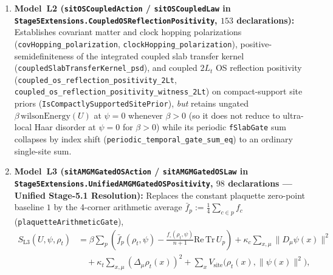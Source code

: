 \begin{enumerate}[leftmargin=2em]
  \item \textbf{Model~L2 (\texttt{sitOSCoupledAction} / \texttt{sitOSCoupledLaw} in \texttt{Stage5\allowbreak{}Extensions.\allowbreak{}Coupled\allowbreak{}OSReflection\allowbreak{}Positivity}, $153$ declarations):} Establishes covariant matter and clock hopping polarizations (\texttt{cov\allowbreak{}Hopping\_\allowbreak{}polarization}, \texttt{clock\allowbreak{}Hopping\_\allowbreak{}polarization}), positive-semidefiniteness of the integrated coupled slab transfer kernel (\texttt{coupled\allowbreak{}Slab\allowbreak{}Transfer\allowbreak{}Kernel\_\allowbreak{}psd}), and coupled $2L_t$ OS reflection positivity (\texttt{coupled\_\allowbreak{}os\_\allowbreak{}reflection\_\allowbreak{}positivity\_\allowbreak{}2\allowbreak{}Lt}, \texttt{coupled\_\allowbreak{}os\_\allowbreak{}reflection\_\allowbreak{}positivity\_\allowbreak{}witness\_\allowbreak{}2\allowbreak{}Lt}) on compact-support site priors (\texttt{Is\allowbreak{}Compactly\allowbreak{}Supported\allowbreak{}Site\allowbreak{}Prior}), \emph{but} retains ungated $\beta\,\mathrm{wilsonEnergy}(U)$ at $\psi = 0$ whenever $\beta > 0$ (so it does not reduce to ultra-local Haar disorder at $\psi = 0$ for $\beta > 0$) while its periodic \texttt{fSlabGate} sum collapses by index shift (\texttt{periodic\_\allowbreak{}temporal\_\allowbreak{}gate\_\allowbreak{}sum\_\allowbreak{}eq}) to an ordinary single-site sum.
  \item \textbf{Model~L3 (\texttt{sitAMGMGatedOSAction} / \texttt{sitAMGMGatedOSLaw} in \texttt{Stage5\allowbreak{}Extensions.\allowbreak{}Unified\allowbreak{}AMGMGated\allowbreak{}OSPositivity}, $98$ declarations --- Unified Stage-5.1 Resolution):} Replaces the constant plaquette zero-point baseline $1$ by the 4-corner arithmetic average $\bar{f}_p := \frac{1}{4}\sum_{c\in p} f_c$ (\texttt{plaquette\allowbreak{}Arithmetic\allowbreak{}Gate}),
  \begin{align}
  S_{\mathrm{L3}}(U,\psi,\rho_t)
  &= \beta\sum_p\left(\bar{f}_p(\rho_t,\psi) - \frac{f_\square(\rho_t,\psi)}{n+1}\mathrm{Re}\,\mathrm{Tr}\,U_p\right)
    + \kappa_c\sum_{x,\mu}\|D_\mu\psi(x)\|^2 \nonumber\\
  &\quad + \kappa_t\sum_{x,\mu}(\Delta_\mu\rho_t(x))^2
    + \sum_x V_{\mathrm{site}}\bigl(\rho_t(x),\|\psi(x)\|^2\bigr),
  \label{eq:model_l3_amgm_action}
  \end{align}

\end{enumerate}
